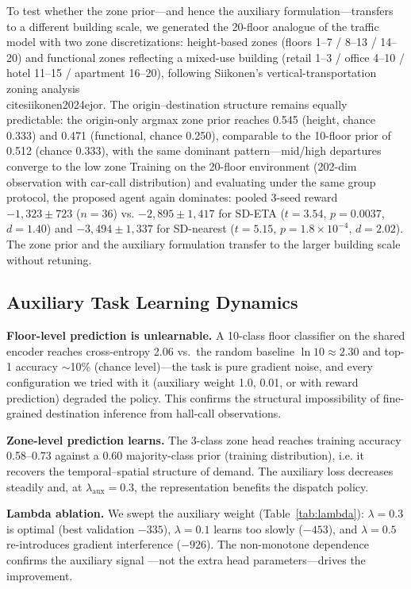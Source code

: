\documentclass{ieeeaccess}
\begin{document}
To test whether the zone prior---and hence the auxiliary
formulation---transfers to a different building scale, we generated
the 20-floor analogue of the traffic model with two zone
discretizations: height-based zones (floors 1--7 / 8--13 / 14--20)
and functional zones reflecting a mixed-use building (retail
1--3 / office 4--10 / hotel 11--15 / apartment 16--20), following
Siikonen's vertical-transportation zoning analysis~\\cite{siikonen2024ejor}.
The origin--destination structure remains equally predictable:
the origin-only argmax zone prior reaches 0.545 (height, chance
0.333) and 0.471 (functional, chance 0.250), comparable to the
10-floor prior of 0.512 (chance 0.333), with the same dominant
pattern---mid/high departures converge to the low zone
Training on the 20-floor
environment (202-dim observation with car-call distribution) and
evaluating under the same group protocol, the proposed agent again
dominates: pooled 3-seed reward $-1{,}323 \pm 723$ ($n = 36$) vs.
$-2{,}895 \pm 1{,}417$ for SD-ETA ($t = 3.54$, $p = 0.0037$,
$d = 1.40$) and $-3{,}494 \pm 1{,}337$ for SD-nearest ($t = 5.15$,
$p = 1.8\times10^{-4}$, $d = 2.02$). The zone prior and the
auxiliary formulation transfer to the larger building scale without
retuning.
\subsection{Auxiliary Task Learning Dynamics}

\textbf{Floor-level prediction is unlearnable.} A 10-class floor
classifier on the shared encoder reaches cross-entropy 2.06 vs.~the
random baseline $\ln 10 \approx 2.30$ and top-1 accuracy $\sim$10\%
(chance level)---the task is pure gradient noise, and every
configuration we tried with it (auxiliary weight 1.0, 0.01, or with
reward prediction) degraded the policy. This confirms the structural
impossibility of fine-grained destination inference from hall-call
observations.

\textbf{Zone-level prediction learns.} The 3-class zone head
reaches training accuracy 0.58--0.73 against a 0.60
majority-class prior (training distribution), i.e. it recovers the temporal--spatial
structure of demand. The auxiliary loss decreases steadily and, at
$\lambda_{\text{aux}} = 0.3$, the representation benefits the
dispatch policy.

\textbf{Lambda ablation.} We swept the auxiliary weight
(Table~\ref{tab:lambda}): $\lambda = 0.3$ is optimal
(best validation $-335$), $\lambda = 0.1$ learns too slowly
($-453$), and $\lambda = 0.5$ re-introduces gradient interference
($-926$). The non-monotone dependence confirms the auxiliary signal
---not the extra head parameters---drives the improvement.
\end{document}
